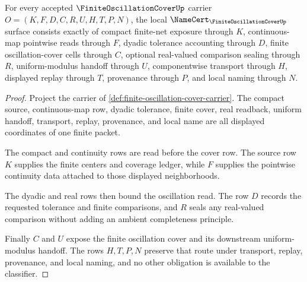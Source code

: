 \begin{theorem}
\label{thm:finite-oscillation-cover-namecert-obligations}
For every accepted $\FiniteOscillationCoverUp$ carrier $O=(K,F,D,C,R,U,H,T,P,N)$, the local $\NameCert_{\FiniteOscillationCoverUp}$ surface consists exactly of compact finite-net exposure through $K$, continuous-map pointwise reads through $F$, dyadic tolerance accounting through $D$, finite oscillation-cover cells through $C$, optional real-valued comparison sealing through $R$, uniform-modulus handoff through $U$, componentwise transport through $H$, displayed replay through $T$, provenance through $P$, and local naming through $N$.
\end{theorem}
\begin{proof}
Project the carrier of \autoref{def:finite-oscillation-cover-carrier}. The compact source, continuous-map row, dyadic tolerance, finite cover, real readback, uniform handoff, transport, replay, provenance, and local name are all displayed coordinates of one finite packet.

The compact and continuity rows are read before the cover row. The source row $K$ supplies the finite centers and coverage ledger, while $F$ supplies the pointwise continuity data attached to those displayed neighborhoods.

The dyadic and real rows then bound the oscillation read. The row $D$ records the requested tolerance and finite comparisons, and $R$ seals any real-valued comparison without adding an ambient completeness principle.

Finally $C$ and $U$ expose the finite oscillation cover and its downstream uniform-modulus handoff. The rows $H,T,P,N$ preserve that route under transport, replay, provenance, and local naming, and no other obligation is available to the classifier.
\end{proof}

